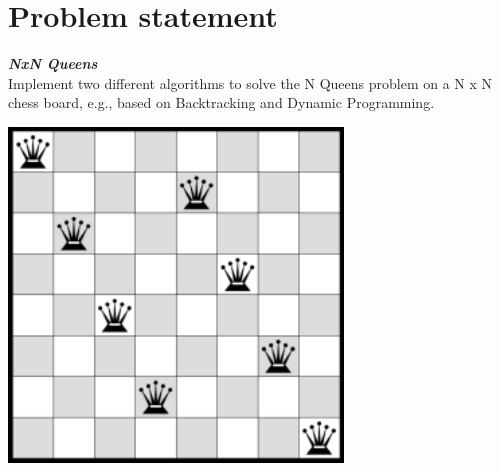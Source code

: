 \documentclass[14pt]{article}
\begin{document}
\section*{Problem statement}
\textbf{\textit{NxN Queens}}
\\
Implement two different algorithms to solve the N Queens problem on a N x N chess board, e.g., based on Backtracking and Dynamic Programming.
\\
\begin{center}\includegraphics[height=3.5in, width = 3.5in]{8-queens-config.png}
\end{center}



\newpage
\end{document}
